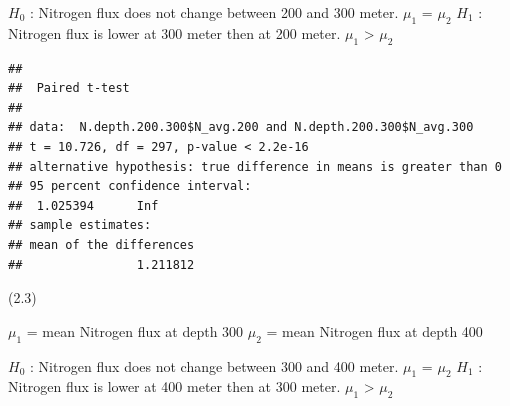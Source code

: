 \documentclass[]{article}
\newenvironment{Shaded}{\begin{snugshade}}{\end{snugshade}}
\newcommand{\DataTypeTok}[1]{\textcolor[rgb]{0.13,0.29,0.53}{#1}}
\newcommand{\FloatTok}[1]{\textcolor[rgb]{0.00,0.00,0.81}{#1}}
\newcommand{\KeywordTok}[1]{\textcolor[rgb]{0.13,0.29,0.53}{\textbf{#1}}}
\newcommand{\NormalTok}[1]{#1}
\newcommand{\OperatorTok}[1]{\textcolor[rgb]{0.81,0.36,0.00}{\textbf{#1}}}
\newcommand{\OtherTok}[1]{\textcolor[rgb]{0.56,0.35,0.01}{#1}}
\newcommand{\StringTok}[1]{\textcolor[rgb]{0.31,0.60,0.02}{#1}}
\begin{document}
\(H_0\) : Nitrogen flux does not change between 200 and 300 meter.
\(\mu_1\) = \(\mu_2\) \(H_1\) : Nitrogen flux is lower at 300 meter then
at 200 meter. \(\mu_1\) \textgreater{} \(\mu_2\)

\begin{Shaded}
\end{Shaded}

\begin{verbatim}
## 
##  Paired t-test
## 
## data:  N.depth.200.300$N_avg.200 and N.depth.200.300$N_avg.300
## t = 10.726, df = 297, p-value < 2.2e-16
## alternative hypothesis: true difference in means is greater than 0
## 95 percent confidence interval:
##  1.025394      Inf
## sample estimates:
## mean of the differences 
##                1.211812
\end{verbatim}

(2.3)

\(\mu_1\) = mean Nitrogen flux at depth 300 \(\mu_2\) = mean Nitrogen
flux at depth 400

\(H_0\) : Nitrogen flux does not change between 300 and 400 meter.
\(\mu_1\) = \(\mu_2\) \(H_1\) : Nitrogen flux is lower at 400 meter then
at 300 meter. \(\mu_1\) \textgreater{} \(\mu_2\)
\end{document}
